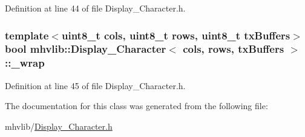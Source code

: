 Definition at line 44 of file Display\-\_\-\-Character.\-h.

\hypertarget{classmhvlib_1_1_display___character_a15cfb25693d29606e1c7cd7d5aaf43dd}{
\subsubsection[{\-\_\-wrap}]{\setlength{\rightskip}{0pt plus 5cm}template$<$uint8\-\_\-t cols, uint8\-\_\-t rows, uint8\-\_\-t tx\-Buffers$>$ bool {\bf mhvlib\-::\-Display\-\_\-\-Character}$<$ cols, rows, tx\-Buffers $>$\-::\-\_\-wrap\hspace{0.3cm}{\ttfamily [protected]}}}\label{classmhvlib_1_1_display___character_a15cfb25693d29606e1c7cd7d5aaf43dd}


Definition at line 45 of file Display\-\_\-\-Character.\-h.



The documentation for this class was generated from the following file\-:\begin{DoxyCompactItemize}
\item 
mhvlib/\hyperlink{_display___character_8h}{Display\-\_\-\-Character.\-h}\end{DoxyCompactItemize}
